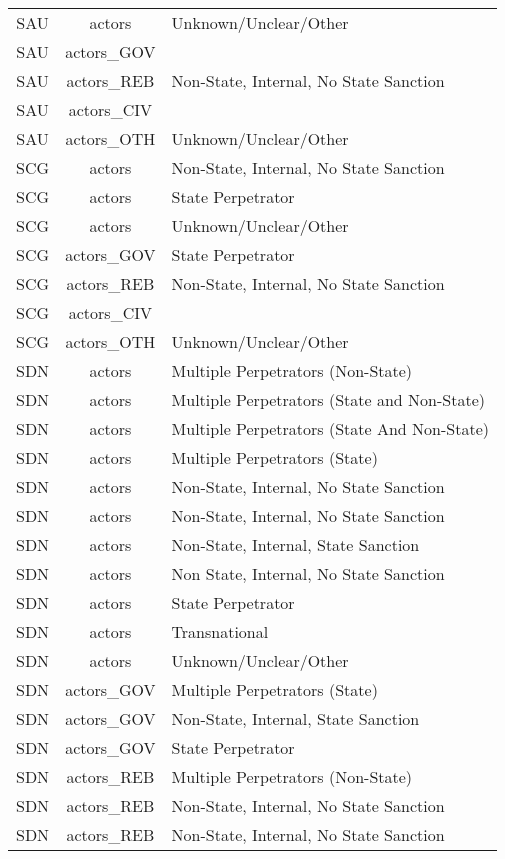 \documentclass[12pt]{article}
\begin{document}
\begin{center}
\begin{longtable}{|c|c|p{10cm}|}
  SAU & actors & Unknown/Unclear/Other \\ 
  SAU & actors\_GOV &  \\ 
  SAU & actors\_REB & Non-State, Internal, No State Sanction \\ 
  SAU & actors\_CIV &  \\ 
  SAU & actors\_OTH & Unknown/Unclear/Other \\ 
  SCG & actors & Non-State, Internal, No State Sanction \\ 
  SCG & actors & State Perpetrator \\ 
  SCG & actors & Unknown/Unclear/Other \\ 
  SCG & actors\_GOV & State Perpetrator \\ 
  SCG & actors\_REB & Non-State, Internal, No State Sanction \\ 
  SCG & actors\_CIV &  \\ 
  SCG & actors\_OTH & Unknown/Unclear/Other \\ 
  SDN & actors & Multiple Perpetrators (Non-State) \\ 
  SDN & actors & Multiple Perpetrators (State and Non-State) \\ 
  SDN & actors & Multiple Perpetrators (State And Non-State) \\ 
  SDN & actors & Multiple Perpetrators (State) \\ 
  SDN & actors & Non-State, Internal, No State Sanction \\ 
  SDN & actors & Non-State, Internal, No State Sanction \\ 
  SDN & actors & Non-State, Internal, State Sanction \\ 
  SDN & actors & Non State, Internal, No State Sanction \\ 
  SDN & actors & State Perpetrator \\ 
  SDN & actors & Transnational \\ 
  SDN & actors & Unknown/Unclear/Other \\ 
  SDN & actors\_GOV & Multiple Perpetrators (State) \\ 
  SDN & actors\_GOV & Non-State, Internal, State Sanction \\ 
  SDN & actors\_GOV & State Perpetrator \\ 
  SDN & actors\_REB & Multiple Perpetrators (Non-State) \\ 
  SDN & actors\_REB & Non-State, Internal, No State Sanction \\ 
  SDN & actors\_REB & Non-State, Internal, No State Sanction \\ 

\end{longtable}
\end{center}
\end{document}

